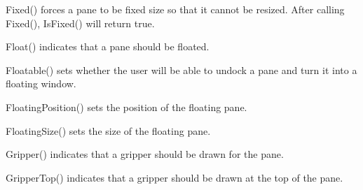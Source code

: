 \label{wxauipaneinfofixed}


Fixed() forces a pane to be fixed size so that it cannot be resized.  After calling Fixed(), IsFixed() will return true.

\label{wxauipaneinfofloat}


Float() indicates that a pane should be floated.

\label{wxauipaneinfofloatable}


Floatable() sets whether the user will be able to undock a pane and turn it into a floating window.

\label{wxauipaneinfofloatingposition}


FloatingPosition() sets the position of the floating pane.

\label{wxauipaneinfofloatingsize}


FloatingSize() sets the size of the floating pane.

\label{wxauipaneinfogripper}


Gripper() indicates that a gripper should be drawn for the pane.

\label{wxauipaneinfogrippertop}


GripperTop() indicates that a gripper should be drawn at the top of the pane.

\label{wxauipaneinfohasborder}


